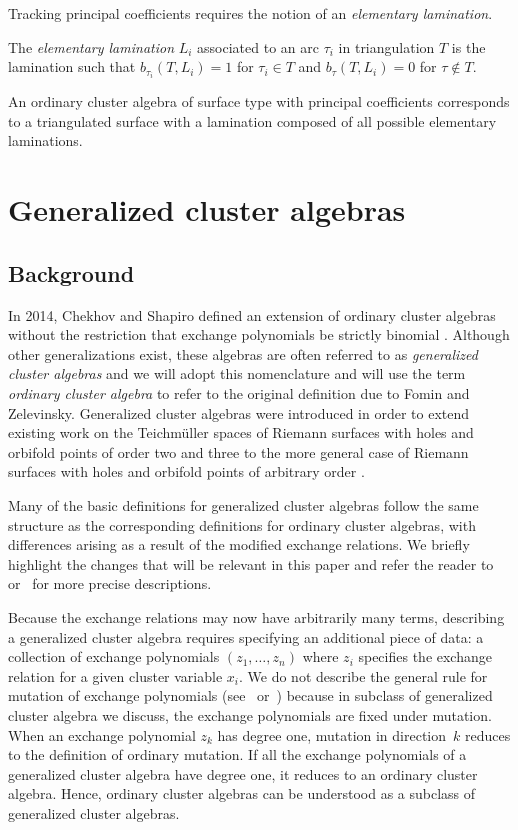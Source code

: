 \documentclass[pdftex]{sigma}%
\numberwithin{equation}{section}
\begin{document}
Tracking principal coefficients requires the notion of an \emph{elementary lamination}.

\begin{Definition}
The \emph{elementary lamination} $L_i$ associated to an arc $\tau_i$ in triangulation $T$ is the lamination such that $b_{\tau_i}(T,L_i) = 1$ for $\tau_i \in T$ and $b_\tau(T,L_i)=0$ for $\tau \not\in T$.
\end{Definition}

 An ordinary cluster algebra of surface type with principal coefficients corresponds to a triangulated surface with a lamination composed of all possible elementary laminations.

\section{Generalized cluster algebras}\label{sec:generalizedClusterAlgebras}

\subsection{Background}

In 2014, Chekhov and Shapiro defined an extension of ordinary cluster algebras \cite{Fomin-Zelevinsky-I} without the restriction that exchange polynomials be strictly binomial \cite{Chekhov-Shapiro}. Although other generalizations exist, these algebras are often referred to as \emph{generalized cluster algebras} and we will adopt this nomenclature and will use the term \emph{ordinary cluster algebra} to refer to the original definition due to Fomin and Zelevinsky. Generalized cluster algebras were introduced in order to extend existing work on the Teichm\"{u}ller spaces of Riemann surfaces with holes and orbifold points of order two and three to the more general case of Riemann surfaces with holes and orbifold points of arbitrary order \cite{Chekhov,Chekhov-Mazzocco-Yangians}.

Many of the basic definitions for generalized cluster algebras follow the same structure as the corresponding definitions for ordinary cluster algebras, with differences arising as a result of the modified exchange relations. We briefly highlight the changes that will be relevant in this paper and refer the reader to~\cite{Chekhov-Shapiro} or~\cite{Nakanishi} for more precise descriptions.

Because the exchange relations may now have arbitrarily many terms, describing a generalized cluster algebra requires specifying an additional piece of data: a collection of exchange polynomials $(z_1,\dots,z_n)$ where $z_i$ specifies the exchange relation for a given cluster variable $x_i$. We do not describe the general rule for mutation of exchange polynomials (see~\cite{Chekhov-Shapiro} or~\cite{Nakanishi}) because in subclass of generalized cluster algebra we discuss, the exchange polynomials are fixed under mutation. When an exchange polynomial $z_k$ has degree one, mutation in direction~$k$ reduces to the definition of ordinary mutation. If all the exchange polynomials of a generalized cluster algebra have degree one, it reduces to an ordinary cluster algebra. Hence, ordinary cluster algebras can be understood as a subclass of generalized cluster algebras.
\end{document}
